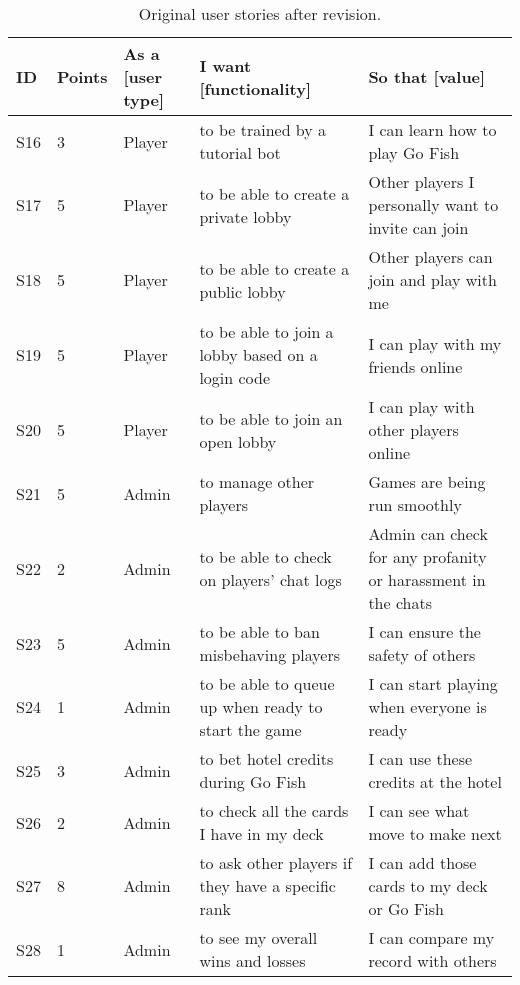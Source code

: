 \pagebreak
\begin{table}[h!]
\centering
\small
\begin{tabularx}{\textwidth}{|l|l|p{1cm}|X|X|}
\hline
\textbf{ID} & \textbf{Points} & \textbf{As a [user type]} & \textbf{I want [functionality]} & \textbf{So that [value]} \\ \hline
S16 & 3 & Player & to be trained by a tutorial bot & I can learn how to play Go Fish \\ \hline
S17 & 5 & Player & to be able to create a private lobby & Other players I personally want to invite can join \\ \hline
S18 & 5 & Player & to be able to create a public lobby & Other players can join and play with me \\ \hline
S19 & 5 & Player & to be able to join a lobby based on a login code & I can play with my friends online \\ \hline
S20 & 5 & Player & to be able to join an open lobby & I can play with other players online \\ \hline
S21 & 5 & Admin & to manage other players & Games are being run smoothly \\ \hline
S22 & 2 & Admin & to be able to check on players' chat logs & Admin can check for any profanity or harassment in the chats \\ \hline
S23 & 5 & Admin & to be able to ban misbehaving players & I can ensure the safety of others \\ \hline
S24 & 1 & Admin & to be able to queue up when ready to start the game & I can start playing when everyone is ready \\ \hline
S25 & 3 & Admin & to bet hotel credits during Go Fish & I can use these credits at the hotel \\ \hline
S26 & 2 & Admin & to check all the cards I have in my deck & I can see what move to make next \\ \hline
S27 & 8 & Admin & to ask other players if they have a specific rank & I can add those cards to my deck or Go Fish \\ \hline
S28 & 1 & Admin & to see my overall wins and losses & I can compare my record with others \\ \hline
\end{tabularx}
\caption{Original user stories after revision.}
\end{table}

\pagebreak
